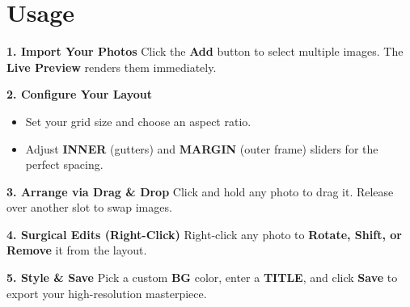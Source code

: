 \documentclass[a4paper]{article}
\begin{document}
\section*{Usage}
\textbf{1. Import Your Photos} Click the \textbf{Add} button to select multiple images. The \textbf{Live Preview} renders them immediately.

\vspace{5pt}
\noindent\textbf{2. Configure Your Layout}
\begin{itemize}
    \item Set your grid size and choose an aspect ratio.
    \item Adjust \textbf{INNER} (gutters) and \textbf{MARGIN} (outer frame) sliders for the perfect spacing.
\end{itemize}

\vspace{5pt}
\noindent\textbf{3. Arrange via Drag \& Drop} Click and hold any photo to drag it. Release over another slot to swap images.

\vspace{5pt}
\noindent\textbf{4. Surgical Edits (Right-Click)} Right-click any photo to \textbf{Rotate, Shift, or Remove} it from the layout.

\vspace{5pt}
\noindent\textbf{5. Style \& Save} Pick a custom \textbf{BG} color, enter a \textbf{TITLE}, and click \textbf{Save} to export your high-resolution masterpiece.
\end{document}
